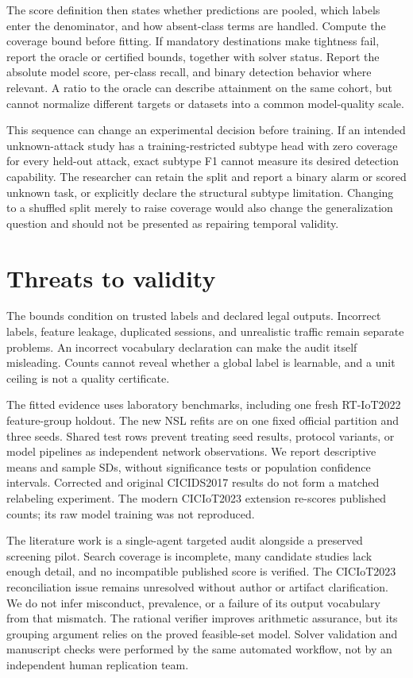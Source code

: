 \documentclass[twocolumn]{svjour3}
\begin{document}
The score definition then states whether predictions are pooled, which labels enter the denominator, and how absent-class terms are handled. Compute the coverage bound before fitting. If mandatory destinations make tightness fail, report the oracle or certified bounds, together with solver status. Report the absolute model score, per-class recall, and binary detection behavior where relevant. A ratio to the oracle can describe attainment on the same cohort, but cannot normalize different targets or datasets into a common model-quality scale.

This sequence can change an experimental decision before training. If an intended unknown-attack study has a training-restricted subtype head with zero coverage for every held-out attack, exact subtype F1 cannot measure its desired detection capability. The researcher can retain the split and report a binary alarm or scored unknown task, or explicitly declare the structural subtype limitation. Changing to a shuffled split merely to raise coverage would also change the generalization question and should not be presented as repairing temporal validity.

\section{Threats to validity}
The bounds condition on trusted labels and declared legal outputs. Incorrect labels, feature leakage, duplicated sessions, and unrealistic traffic remain separate problems. An incorrect vocabulary declaration can make the audit itself misleading. Counts cannot reveal whether a global label is learnable, and a unit ceiling is not a quality certificate.

The fitted evidence uses laboratory benchmarks, including one fresh RT-IoT2022 feature-group holdout. The new NSL refits are on one fixed official partition and three seeds. Shared test rows prevent treating seed results, protocol variants, or model pipelines as independent network observations. We report descriptive means and sample SDs, without significance tests or population confidence intervals. Corrected and original CICIDS2017 results do not form a matched relabeling experiment. The modern CICIoT2023 extension re-scores published counts; its raw model training was not reproduced.

The literature work is a single-agent targeted audit alongside a preserved screening pilot. Search coverage is incomplete, many candidate studies lack enough detail, and no incompatible published score is verified. The CICIoT2023 reconciliation issue remains unresolved without author or artifact clarification. We do not infer misconduct, prevalence, or a failure of its output vocabulary from that mismatch. The rational verifier improves arithmetic assurance, but its grouping argument relies on the proved feasible-set model. Solver validation and manuscript checks were performed by the same automated workflow, not by an independent human replication team.
\end{document}

